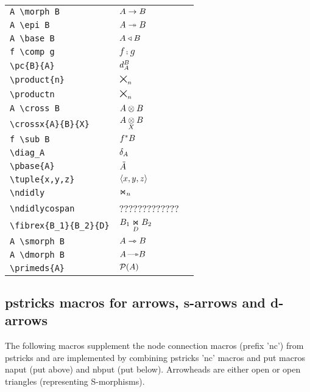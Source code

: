 \documentclass[10pt,a4paper]{article}
\begin{document}
\begin{tabular}{|l|p{4cm}|p{6cm}|}
\verb!A \morph B! & $A \morph B $     &\\
\verb!A \epi B  ! & $A \epi B$        &\\ 
\verb!A \base B! & $A \base B$        &\\
\verb!f \comp g !& $ f \comp g$       &\\
\verb!\pc{B}{A} !& $ \pc{B}{A}$       &\\
\verb!\product{n}  !& $ \product{n} $       &\\
\verb!\productn    !& $ \productn $       &\\
\verb!A \cross B!&$A \cross B$        &\\
\verb!\crossx{A}{B}{X}!& $\crossx{A}{B}{X}$ &\\
\verb!f \sub B!&$f \sub B$                  &\\
\verb!\diag_A!&$\diag_A$                    &\\
\verb!\pbase{A}!&$\pbase{A}$                &\\
\verb!\tuple{x,y,z}!& $\tuple{x,y,z}$       &\\
\verb!\ndidly!& $\ndidly$                   &\\
\verb!\ndidlycospan!& ?????????????       &\\
\verb!\fibrex{B_1}{B_2}{D}!& $\fibrex{B_1}{B_2}{D}$  &\\
\verb!A \smorph B!& $A \smorph B$                    &\\
\verb!A \dmorph B!& $A \dmorph B$                    &\\
\verb!\primeds{A}!& $\primeds{A}$                    &\\
\hline
\end{tabular}
\newpage
\subsection {pstricks macros for arrows, s-arrows and d-arrows}
The following macros supplement the node connection macros (prefix 'nc') from pstricks and are implemented by combining pstricks 'nc' macros and put macros naput (put above) and nbput (put below). Arrowheads are either open or open triangles (representing S-morphisms). \\
\end{document}
